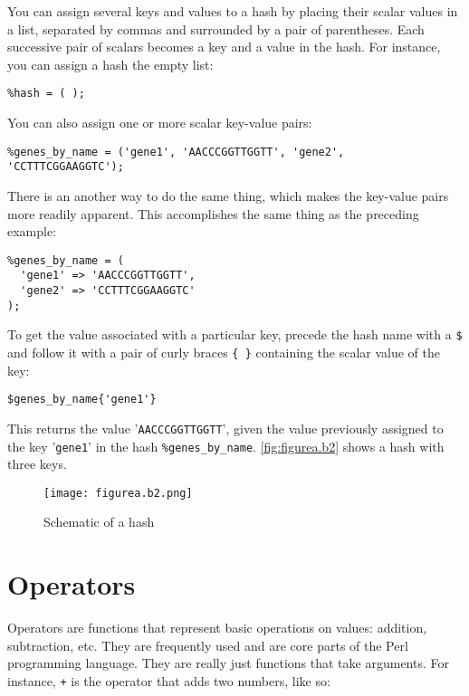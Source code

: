 You can assign several keys and values to a hash by placing their scalar values in a list, separated by commas and surrounded by a pair of parentheses. Each successive pair of scalars becomes a key and a value in the hash. For instance, you can assign a hash the empty list:

\begin{lstlisting}
%hash = ( );
\end{lstlisting}

You can also assign one or more scalar key-value pairs:

\begin{lstlisting}
%genes_by_name = ('gene1', 'AACCCGGTTGGTT', 'gene2', 'CCTTTCGGAAGGTC');
\end{lstlisting}

There is an another way to do the same thing, which makes the key-value pairs more readily apparent. This accomplishes the same thing as the preceding example:

\begin{lstlisting}
%genes_by_name = (
  'gene1' => 'AACCCGGTTGGTT',
  'gene2' => 'CCTTTCGGAAGGTC'
);
\end{lstlisting}

To get the value associated with a particular key, precede the hash name with a \verb|$| and follow it with a pair of curly braces \verb|{ }| containing the scalar value of the key:

\begin{lstlisting}
$genes_by_name{'gene1'}
\end{lstlisting}

This returns the value '\verb|AACCCGGTTGGTT|', given the value previously assigned to the key '\verb|gene1|' in the hash \verb|%genes_by_name|. \autoref{fig:figurea.b2} shows a hash with three keys.

\begin{figure}
  \centering
  \texttt{[image: figurea.b2.png]}
  \caption{Schematic of a hash}
  \label{fig:figurea.b2}
 \end{figure}{}

\section{Operators}
Operators are functions that represent basic operations on values: addition, subtraction, etc. They are frequently used and are core parts of the Perl programming language. They are really just functions that take arguments. For instance, \verb|+| is the operator that adds two numbers, like so:

